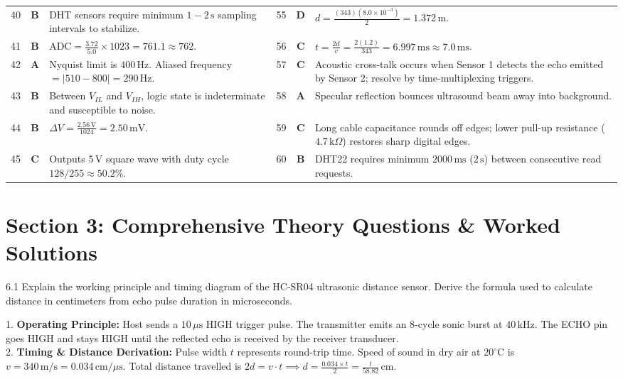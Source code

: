 \begin{table}[htbp]
\begin{tabularx}{\textwidth}{l c X l c X}
40 & \textbf{B} & DHT sensors require minimum $1-2\,\text{s}$ sampling intervals to stabilize. & 55 & \textbf{D} & $d = \frac{(343)(8.0\times 10^{-3})}{2} = 1.372\,\text{m}$. \\
41 & \textbf{B} & $\text{ADC} = \frac{3.72}{5.0} \times 1023 = 761.1 \approx 762$. & 56 & \textbf{C} & $t = \frac{2 d}{v} = \frac{2(1.2)}{343} = 6.997\,\text{ms} \approx 7.0\,\text{ms}$. \\
42 & \textbf{A} & Nyquist limit is $400\,\text{Hz}$. Aliased frequency $= |510 - 800| = 290\,\text{Hz}$. & 57 & \textbf{C} & Acoustic cross-talk occurs when Sensor 1 detects the echo emitted by Sensor 2; resolve by time-multiplexing triggers. \\
43 & \textbf{B} & Between $V_{IL}$ and $V_{IH}$, logic state is indeterminate and susceptible to noise. & 58 & \textbf{A} & Specular reflection bounces ultrasound beam away into background. \\
44 & \textbf{B} & $\Delta V = \frac{2.56\,\text{V}}{1024} = 2.50\,\text{mV}$. & 59 & \textbf{C} & Long cable capacitance rounds off edges; lower pull-up resistance ($4.7\,\text{k}\Omega$) restores sharp digital edges. \\
45 & \textbf{C} & Outputs $5\,\text{V}$ square wave with duty cycle $128/255 \approx 50.2\%$. & 60 & \textbf{B} & DHT22 requires minimum $2000\,\text{ms}$ ($2\,\text{s}$) between consecutive read requests. \\
\bottomrule
\end{tabularx}
\end{table}

\newpage
\section{Section 3: Comprehensive Theory Questions \& Worked Solutions}
\begin{theoryq}{6.1}
Explain the working principle and timing diagram of the HC-SR04 ultrasonic distance sensor. Derive the formula used to calculate distance in centimeters from echo pulse duration in microseconds.
\end{theoryq}

\begin{theorysol}
1. \textbf{Operating Principle:} Host sends a $10\,\mu\text{s}$ HIGH trigger pulse. The transmitter emits an 8-cycle sonic burst at $40\,\text{kHz}$. The ECHO pin goes HIGH and stays HIGH until the reflected echo is received by the receiver transducer.\\
2. \textbf{Timing \& Distance Derivation:} Pulse width $t$ represents round-trip time. Speed of sound in dry air at $20^\circ\text{C}$ is $v = 340\,\text{m/s} = 0.034\,\text{cm}/\mu\text{s}$. Total distance travelled is $2d = v \cdot t \implies d = \frac{0.034 \times t}{2} = \frac{t}{58.82}\,\text{cm}$.
\end{theorysol}

\vspace{3mm}

